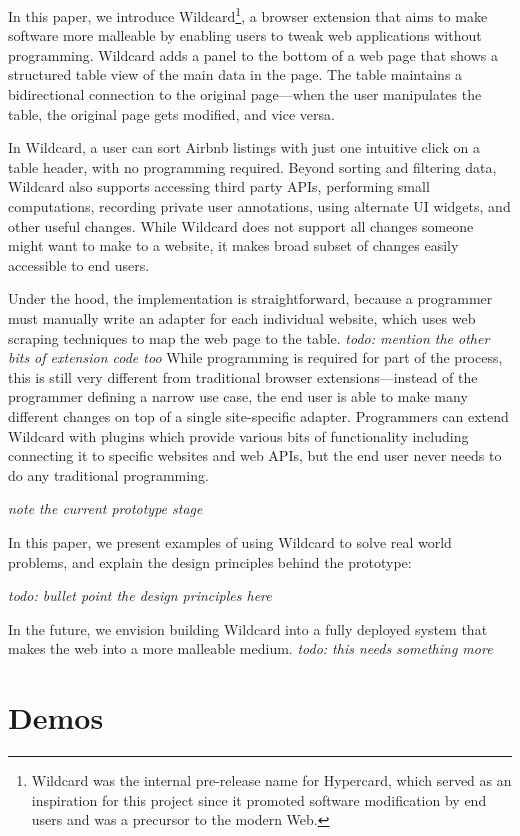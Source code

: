 \documentclass[english,submission]{programming}
\begin{document}
In this paper, we introduce Wildcard\footnote{Wildcard was the internal
  pre-release name for Hypercard, which served as an inspiration for
  this project since it promoted software modification by end users and
  was a precursor to the modern Web.}, a browser extension that aims to
make software more malleable by enabling users to tweak web applications
without programming. Wildcard adds a panel to the bottom of a web page
that shows a structured table view of the main data in the page. The
table maintains a bidirectional connection to the original page---when
the user manipulates the table, the original page gets modified, and
vice versa.

In Wildcard, a user can sort Airbnb listings with just one intuitive
click on a table header, with no programming required. Beyond sorting
and filtering data, Wildcard also supports accessing third party APIs,
performing small computations, recording private user annotations, using
alternate UI widgets, and other useful changes. While Wildcard does not
support all changes someone might want to make to a website, it makes
broad subset of changes easily accessible to end users.

Under the hood, the implementation is straightforward, because a
programmer must manually write an adapter for each individual website,
which uses web scraping techniques to map the web page to the table.
\emph{todo: mention the other bits of extension code too} While
programming is required for part of the process, this is still very
different from traditional browser extensions---instead of the
programmer defining a narrow use case, the end user is able to make many
different changes on top of a single site-specific adapter. Programmers
can extend Wildcard with plugins which provide various bits of
functionality including connecting it to specific websites and web APIs,
but the end user never needs to do any traditional programming.

\emph{note the current prototype stage}

In this paper, we present examples of using Wildcard to solve real world
problems, and explain the design principles behind the prototype:

\emph{todo: bullet point the design principles here}

In the future, we envision building Wildcard into a fully deployed
system that makes the web into a more malleable medium. \emph{todo: this
needs something more}

\hypertarget{demos}{%
\section{Demos}\label{demos}}
\end{document}
